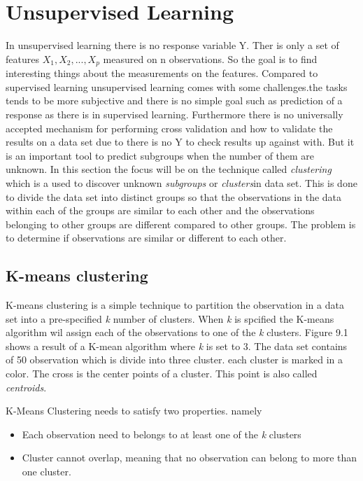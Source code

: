 \chapter{Unsupervised Learning}
\label{chp:unsuplea}
In unsupervised learning there is no response variable Y. Ther is only a set of features $X_1, X_2,..., X_p$ measured on n observations. So the goal is to find interesting things about the measurements on the features.
Compared to supervised learning unsupervised learning comes with some challenges.the tasks tends to be more subjective and there is no simple goal such as prediction of a response as there is in supervised learning. Furthermore there is no universally accepted mechanism for performing cross validation and how to validate the results on a data set due to there is no Y to check results up against with.
But it is an important tool to predict subgroups when the number of them are unknown.
In this section the focus will be on the  technique called \emph{clustering} which is a used to discover unknown \emph{subgroups} or \emph{clusters}in data set. This is done to divide the data set into distinct groups so that the observations in the data within each of the groups are similar to each other and the observations belonging to other groups are different compared to other groups. 
The problem is to determine if observations are similar or different to each other.
 
\section{K-means clustering}
\label{chp:clus}
K-means clustering is a simple technique to partition the observation in a data set into a pre-specified \emph{k} number of clusters. When \emph{k} is spcified the K-means algorithm wil assign each of the observations to one of the \emph{k} clusters.
Figure 9.1 shows a result of a K-mean algorithm where \emph{k} is set to 3. The data set contains of 50 observation which is divide into three cluster. each cluster is marked in a color. The cross is the center points of a cluster. This point is also called \emph{centroids}.


K-Means Clustering needs to satisfy two properties. namely
\begin{itemize}
	\item Each observation need to belongs to at least one of the \emph{k} clusters
	\item Cluster cannot overlap, meaning that no observation can belong to more than one cluster.
\end{itemize} 

